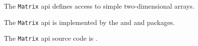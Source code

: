 
The {\tt Matrix} api defines access to simple two-dimensional arrays.

The {\tt Matrix} api is implemented by the 
 and 
 and 
packages.

The {\tt Matrix} api source code is .





